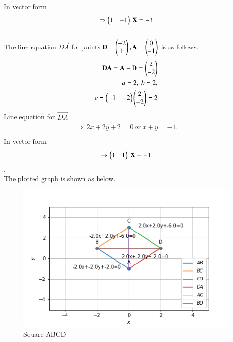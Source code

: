 \documentclass[journal,12pt,twocolumn]{IEEEtran}
\begin{document}
In vector form
\begin{align}
\begin{split}
\Rightarrow \begin{pmatrix}1&-1\end{pmatrix}\ \mathbf{X}=-3
\end{split}
\end{align}
\\
The line equation $\vec{DA}$ for points $\mathbf{D} = \begin{pmatrix}-2\\1\end{pmatrix}, \mathbf{A} = \begin{pmatrix}0\\-1\end{pmatrix}$ is as follows:\\
\begin{align}
\begin{split}
\mathbf{DA} = \mathbf{A}-\mathbf{D} = \begin{pmatrix}2\\-2\end{pmatrix}\\
a=2,\ b=2,\\
c=\begin{pmatrix}-1 & -2\end{pmatrix} \begin{pmatrix}2\\-2\end{pmatrix}=2\\
\end{split}
\end{align}
Line equation for $\vec{DA}$
\begin{align}
\begin{split}
\Rightarrow\ 2x+2y+2=0 \ or \ x+y=-1. \\
\end{split}
\end{align}
In vector form
\begin{align}
\begin{split}
\Rightarrow \begin{pmatrix}1&1\end{pmatrix}\ \mathbf{X}=-1
\end{split}
\end{align}.
\\
The plotted graph is shown as below.
\begin{figure}[!ht]
    \centering
    \includegraphics[width=\columnwidth]{assignment2_using affine.png}
    \caption{Square ABCD}
    \label{fig:Square ABCD}
\end{figure}
\end{document}

